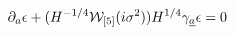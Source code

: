 \begin{equation}
\partial _{a}\epsilon +(H^{-1/4}\mathcal{W}_{[5]}(i\sigma ^{2}))H^{1/4}\gamma _{%
\underline{a}}\epsilon =0\,
\end{equation}

